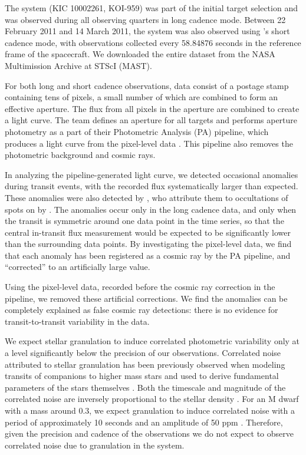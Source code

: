 The \LHS{} system (KIC 10002261, KOI-959) was part of the initial \itk{} target selection and was observed during all observing quarters in long cadence mode.
Between 22 February 2011 and 14 March 2011, the system was also observed using \itk's short cadence mode, with observations collected every 58.84876 seconds in the reference frame of the spacecraft. 
We downloaded the entire dataset from the NASA Multimission Archive at STScI (MAST). 

For both long and short cadence observations, \itk{} data consist of a postage stamp containing tens of pixels, a small number of which are combined to form an effective aperture.
The flux from all pixels in the aperture are combined to create a light curve. 
The \itk{} team defines an aperture for all targets and performs aperture photometry as a part of their Photometric Analysis (PA) pipeline, which produces a light curve from the pixel-level data \citep{Jenkins10}. 
This pipeline also removes the photometric background and cosmic rays. 

In analyzing the pipeline-generated light curve, we detected occasional anomalies during transit events, with the recorded flux systematically larger than expected.
These anomalies were also detected by \citet{Herrero13}, who attribute them to occultations of spots on \LA{} by \LC. 
The anomalies occur only in the long cadence data, and only when the transit is symmetric around one data point in the \itk{} time series, so that the central in-transit flux measurement would be expected to be significantly lower than the surrounding data points.
By investigating the pixel-level data, we find that each anomaly has been registered as a cosmic ray by the PA pipeline, and ``corrected'' to an artificially large value.

Using the pixel-level data, recorded before the cosmic ray correction in the pipeline, we removed these artificial corrections. 
We find the anomalies can be completely explained as false cosmic ray detections: there is no evidence for transit-to-transit variability in the \itk{} data.

We expect stellar granulation to induce correlated photometric variability only at a level significantly below the precision of our observations.
Correlated noise attributed to stellar granulation has been previously observed when modeling transits of companions to higher mass stars \citep[e.g.][]{Huber13} and used to derive fundamental parameters of the stars themselves \citep{Bastien13}.
Both the timescale and magnitude of the correlated noise are inversely proportional to the stellar density \citep{Gilliland10}.
For an M dwarf with a mass around 0.3\msun, we expect granulation to induce correlated noise with a period of approximately 10 seconds and an amplitude of 50 ppm \citep{Winget91}. 
Therefore, given the precision and cadence of the \itk{} observations we do not expect to observe correlated noise due to granulation in the \LHS{} system. 

